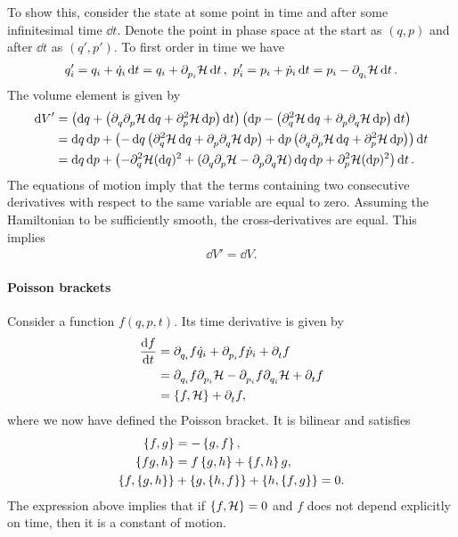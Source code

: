 To show this, consider the state at some point in time and after some infinitesimal time $\dd{t}$. Denote the point in phase space at the start as $(q, p)$ and after $\dd{t}$ as $(q', p').$ To first order in time we have
\begin{align*}
	q_{i}' = q_{i} + \dot{q}_{i}\dd{t} = q_{i} + \del{p_{i}}{\ham}\dd{t},\ p_{i}' = p_{i} + \dot{p}_{i}\dd{t} = p_{i} - \del{q_{i}}{\ham}\dd{t}.
\end{align*}
The volume element is given by
\begin{align*}
	\dd{V}' &= \left(\dd{q} +  \left(\del{q}{\del{p}{\ham}}\dd{q} + \del[2]{p}{\ham}\dd{p}\right)\dd{t}\right)\left(\dd{p} -  \left(\del[2]{q}{\ham}\dd{q} + \del{p}{\del{q}{\ham}}\dd{p}\right)\dd{t}\right) \\
	        &= \dd{q}\dd{p} + \left(-\dd{q}\left(\del[2]{q}{\ham}\dd{q} + \del{p}{\del{q}{\ham}}\dd{p}\right) + \dd{p\left(\del{q}{\del{p}{\ham}}\dd{q} + \del[2]{p}{\ham}\dd{p}\right)}\right)\dd{t} \\
	        &= \dd{q}\dd{p} + \left(-\del[2]{q}{\ham}(\dd{q})^{2} + (\del{q}{\del{p}{\ham}} - \del{p}{\del{q}{\ham}})\dd{q}\dd{p} + \del[2]{p}{\ham}(\dd{p})^{2}\right)\dd{t}.
\end{align*}
The equations of motion imply that the terms containing two consecutive derivatives with respect to the same variable are equal to zero. Assuming the Hamiltonian to be sufficiently smooth, the cross-derivatives are equal. This implies
\begin{align*}
	\dd{V}' = \dd{V}.
\end{align*}

\paragraph{Poisson brackets}
Consider a function $f(q, p, t)$. Its time derivative is given by
\begin{align*}
	\dv{f}{t} &= \del{q_{i}}{f}\dot{q}_{i} + \del{p_{i}}{f}\dot{p}_{i} + \del{t}{f} \\
	          &= \del{q_{i}}{f}\del{p_{i}}{\ham} - \del{p_{i}}{f}\del{q_{i}}{\ham} + \del{t}{f} \\
	          &= \pob{f}{\ham} + \del{t}{f},
\end{align*}
where we now have defined the Poisson bracket. It is bilinear and satisfies
\begin{align*}
	\pob{f}{g}          &= -\pob{g}{f}, \\
	\pob{fg}{h}         &= f\pob{g}{h} + \pob{f}{h}g, \\
	\pob{f}{\pob{g}{h}} &+ \pob{g}{\pob{h}{f}} + \pob{h}{\pob{f}{g}} = 0.
\end{align*}
The expression above implies that if $\pob{f}{\ham} = 0$ and $f$ does not depend explicitly on time, then it is a constant of motion.

